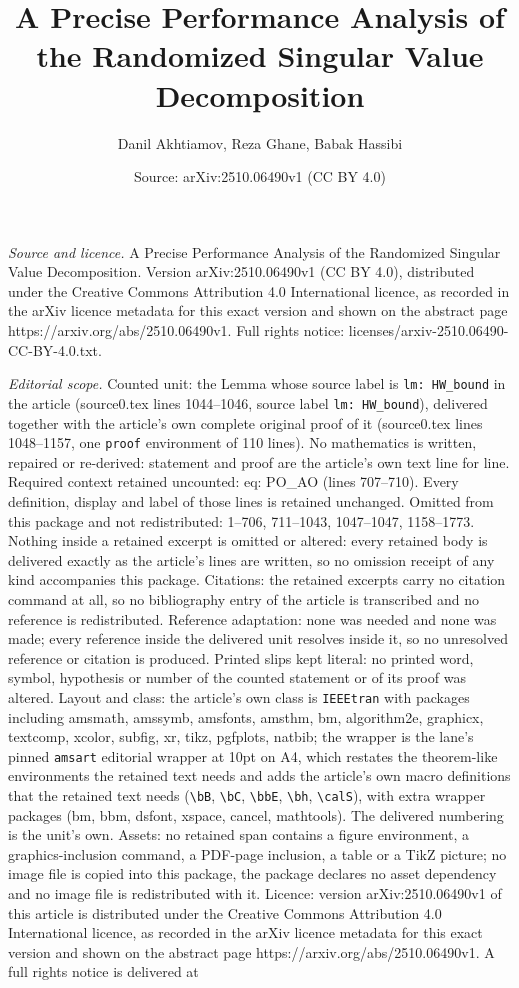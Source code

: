 \documentclass[10pt,a4paper]{amsart}
\title[A Precise Performance Analysis of the Randomized Singular Va]{A Precise Performance Analysis of the Randomized Singular Value Decomposition}
\author{Danil Akhtiamov, Reza Ghane, Babak Hassibi}
\date{Source: arXiv:2510.06490v1 (CC BY 4.0)}
\begin{document}
\maketitle

\noindent\emph{Source and licence.} A Precise Performance Analysis of the Randomized Singular Value Decomposition. Version arXiv:2510.06490v1 (CC BY 4.0), distributed under the Creative Commons Attribution 4.0 International licence, as recorded in the arXiv licence metadata for this exact version and shown on the abstract page https://arxiv.org/abs/2510.06490v1. Full rights notice: licenses/arxiv-2510.06490-CC-BY-4.0.txt.\par\smallskip

\noindent\textit{Editorial scope.} Counted unit: the Lemma whose source label is \texttt{lm: HW\_bound} in the article (source0.tex lines 1044--1046, source label \texttt{lm: HW\_bound}), delivered together with the article's own complete original proof of it (source0.tex lines 1048--1157, one \texttt{proof} environment of 110 lines). No mathematics is written, repaired or re-derived: statement and proof are the article's own text line for line. Required context retained uncounted: eq: PO\_AO (lines 707--710). Every definition, display and label of those lines is retained unchanged. Omitted from this package and not redistributed: 1--706, 711--1043, 1047--1047, 1158--1773. Nothing inside a retained excerpt is omitted or altered: every retained body is delivered exactly as the article's lines are written, so no omission receipt of any kind accompanies this package. Citations: the retained excerpts carry no citation command at all, so no bibliography entry of the article is transcribed and no reference is redistributed. Reference adaptation: none was needed and none was made; every reference inside the delivered unit resolves inside it, so no unresolved reference or citation is produced. Printed slips kept literal: no printed word, symbol, hypothesis or number of the counted statement or of its proof was altered. Layout and class: the article's own class is \texttt{IEEEtran} with packages including amsmath, amssymb, amsfonts, amsthm, bm, algorithm2e, graphicx, textcomp, xcolor, subfig, xr, tikz, pgfplots, natbib; the wrapper is the lane's pinned \texttt{amsart} editorial wrapper at 10pt on A4, which restates the theorem-like environments the retained text needs and adds the article's own macro definitions that the retained text needs (\texttt{\textbackslash bB}, \texttt{\textbackslash bC}, \texttt{\textbackslash bbE}, \texttt{\textbackslash bh}, \texttt{\textbackslash calS}), with extra wrapper packages (bm, bbm, dsfont, xspace, cancel, mathtools). The delivered numbering is the unit's own. Assets: no retained span contains a figure environment, a graphics-inclusion command, a PDF-page inclusion, a table or a TikZ picture; no image file is copied into this package, the package declares no asset dependency and no image file is redistributed with it. Licence: version arXiv:2510.06490v1 of this article is distributed under the Creative Commons Attribution 4.0 International licence, as recorded in the arXiv licence metadata for this exact version and shown on the abstract page https://arxiv.org/abs/2510.06490v1. A full rights notice is delivered at 
\end{document}
